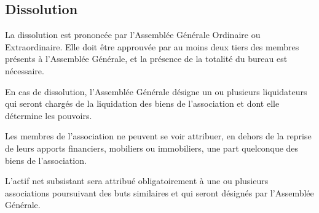 \documentclass[a4paper,french,10pt]{article}
\begin{document}
\subsection{Dissolution}
\label{sec:dissolution}
La dissolution est prononcée par l'Assemblée Générale Ordinaire ou
Extraordinaire. Elle doit être approuvée par au moins deux tiers des
membres présents à l'Assemblée Générale, et la présence de la totalité
du bureau est nécessaire.

En cas de dissolution, l’Assemblée Générale désigne un ou plusieurs
liquidateurs qui seront chargés de la liquidation des biens de
l’association et dont elle détermine les pouvoirs.

Les membres de l’association ne peuvent se voir attribuer, en dehors
de la reprise de leurs apports financiers, mobiliers ou immobiliers,
une part quelconque des biens de l’association.

L’actif net subsistant sera attribué obligatoirement à une ou
plusieurs associations poursuivant des buts similaires et qui seront
désignés par l’Assemblée Générale.
\end{document}
